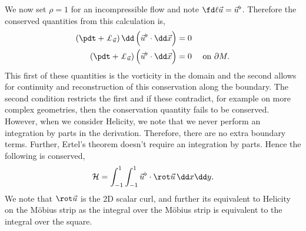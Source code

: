 We now set $\rho = 1$ for an incompressible flow and note $\fd \ell {\vec u} = \vec u^\flat$. Therefore the conserved quantities from this calculation is,
\begin{align*}
  \left( \pdt + \pounds_{\vec u}\right)\dd \left(\vec u^\flat \cdot \dd\vec x\right) &= 0 \\
  \left( \pdt + \pounds_{\vec u}\right) \left( \vec u^\flat\cdot \dd \vec x \right) &= 0 & \text{ on } \partial M.
\end{align*}
This first of these quantities is the vorticity in the domain and the second allows for continuity and reconstruction of this conservation along the boundary. The second condition restricts the first and if these contradict, for example on more complex geometries, then the conservation quantity fails to be conserved. However, when we consider Helicity, we note that we never perform an integration by parts in the derivation. Therefore, there are no extra boundary terms. Further, Ertel's theorem doesn't require an integration by parts. Hence the following is conserved,
$$ \mathcal{H} = \int_{-1}^1 \int_{-1}^1 \vec u^\flat \cdot \rot \vec u\, \dd x\dd y. $$
We note that $\rot \vec u$ is the 2D scalar curl, and further its equivalent to Helicity on the M\"obius strip as the integral over the M\"obius strip is equivalent to the integral over the square.